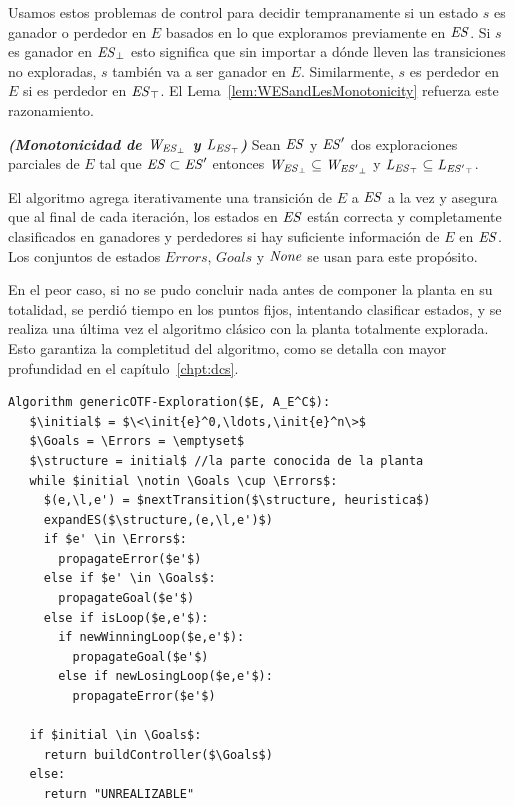 Usamos estos problemas de control para decidir tempranamente si un estado $s$ es ganador o perdedor en $E$ basados en lo que exploramos previamente en $\mathit{ES}$. Si $s$ es ganador en $\mathit{{\mathit{ES}}_{\bot}}$ esto significa que sin importar a dónde lleven las transiciones no exploradas, $s$ también va a ser ganador en $E$. Similarmente, $s$ es perdedor en $E$ si es perdedor en $\mathit{{\mathit{ES}}_{\top}}$.
El Lema~\ref{lem:WESandLesMonotonicity} refuerza este razonamiento.


\begin{lemma}\textbf{\emph{(Monotonicidad de $\mathit{W_{\mathit{{\mathit{ES}}_{\bot}}}}$ y $\mathit{L_{\mathit{{\mathit{ES}}_{\top}}}}$)}}
	\label{lem:WESandLesMonotonicity}
	Sean $\mathit{ES}$ y $\mathit{ES}'$ dos exploraciones parciales de $E$ tal que $\mathit{ES} 
	\subset \mathit{ES}'$ entonces $\mathit{W_{\mathit{{\mathit{ES}}_{\bot}}}} \subseteq \mathit{W_{\mathit{{\mathit{ES}'}_{\bot}}}}$ y $\mathit{L_{\mathit{{\mathit{ES}}_{\top}}}} \subseteq 
	\mathit{L_{\mathit{{\mathit{ES}'}_{\top}}}}$.
\end{lemma}

El algoritmo agrega iterativamente una transición de $E$ a $\mathit{ES}$ a la vez y asegura que al final de cada iteración, los estados en $\mathit{ES}$ están correcta y completamente clasificados en ganadores y perdedores si hay suficiente información de $E$ en $\mathit{ES}$. Los conjuntos de estados $Errors$, 
$Goals$ y $\mathit{None}$ se usan para este propósito.



En el peor caso, si no se pudo concluir nada antes de componer la planta en su totalidad, se perdió tiempo en los puntos fijos, intentando clasificar estados, y se realiza una última vez el algoritmo clásico con la planta totalmente explorada. Esto garantiza la completitud del algoritmo, como se detalla con mayor profundidad en el capítulo~\ref{chpt:dcs}.

\begin{lstlisting}[language={pseudocode},label={lst:on-the-fly},caption={Nuestro enfoque on-the-fly},float=ht]
Algorithm genericOTF-Exploration($E, A_E^C$):
   $\initial$ = $\<\init{e}^0,\ldots,\init{e}^n\>$
   $\Goals = \Errors = \emptyset$
   $\structure = initial$ //la parte conocida de la planta
   while $initial \notin \Goals \cup \Errors$:
     $(e,\l,e') = $nextTransition($\structure, heuristica$)
     expandES($\structure,(e,\l,e')$)
     if $e' \in \Errors$:
       propagateError($e'$)
     else if $e' \in \Goals$:
       propagateGoal($e'$)
     else if isLoop($e,e'$):
       if newWinningLoop($e,e'$):
         propagateGoal($e'$)
       else if newLosingLoop($e,e'$):
         propagateError($e'$)
         
   if $initial \in \Goals$:
     return buildController($\Goals$)
   else:
     return "UNREALIZABLE"  
\end{lstlisting}

